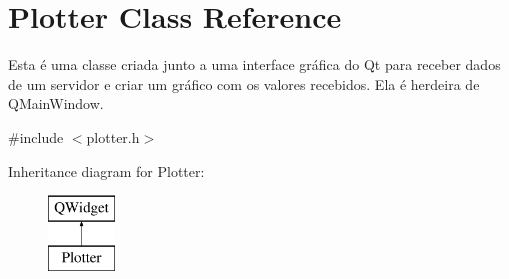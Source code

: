 \hypertarget{class_plotter}{}\section{Plotter Class Reference}
\label{class_plotter}


Esta é uma classe criada junto a uma interface gráfica do Qt para receber dados de um servidor e criar um gráfico com os valores recebidos. Ela é herdeira de Q\+Main\+Window.  




{\ttfamily \#include $<$plotter.\+h$>$}

Inheritance diagram for Plotter\+:\begin{figure}[H]
\begin{center}
\leavevmode
\includegraphics[height=2.000000cm]{class_plotter}
\end{center}
\end{figure}
